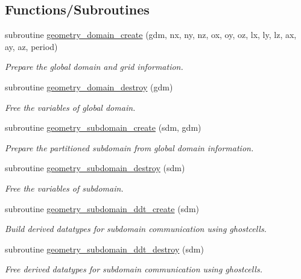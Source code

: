\subsection*{Functions/\+Subroutines}
\begin{DoxyCompactItemize}
\item 
subroutine \hyperlink{namespacegeometry_a707b3bbf32a44b01c6a4f28e2be7d0fc}{geometry\+\_\+domain\+\_\+create} (gdm, nx, ny, nz, ox, oy, oz, lx, ly, lz, ax, ay, az, period)
\begin{DoxyCompactList}\small\item\em Prepare the global domain and grid information. \end{DoxyCompactList}\item 
subroutine \hyperlink{namespacegeometry_a46da96ff458eea5b671bec82e56dc6fb}{geometry\+\_\+domain\+\_\+destroy} (gdm)
\begin{DoxyCompactList}\small\item\em Free the variables of global domain. \end{DoxyCompactList}\item 
subroutine \hyperlink{namespacegeometry_ad0835bda792428d5f72a71aa6ebd1526}{geometry\+\_\+subdomain\+\_\+create} (sdm, gdm)
\begin{DoxyCompactList}\small\item\em Prepare the partitioned subdomain from global domain information. \end{DoxyCompactList}\item 
subroutine \hyperlink{namespacegeometry_ab546189e0ddda7aea0d8cd6e479ff8f1}{geometry\+\_\+subdomain\+\_\+destroy} (sdm)
\begin{DoxyCompactList}\small\item\em Free the variables of subdomain. \end{DoxyCompactList}\item 
subroutine \hyperlink{namespacegeometry_a559a7fbc4327cc9a54789163e414b6eb}{geometry\+\_\+subdomain\+\_\+ddt\+\_\+create} (sdm)
\begin{DoxyCompactList}\small\item\em Build derived datatypes for subdomain communication using ghostcells. \end{DoxyCompactList}\item 
subroutine \hyperlink{namespacegeometry_a29d3bd98ea090130609cf1dba291ceb4}{geometry\+\_\+subdomain\+\_\+ddt\+\_\+destroy} (sdm)
\begin{DoxyCompactList}\small\item\em Free derived datatypes for subdomain communication using ghostcells. \end{DoxyCompactList}\item 

\end{DoxyCompactItemize}
